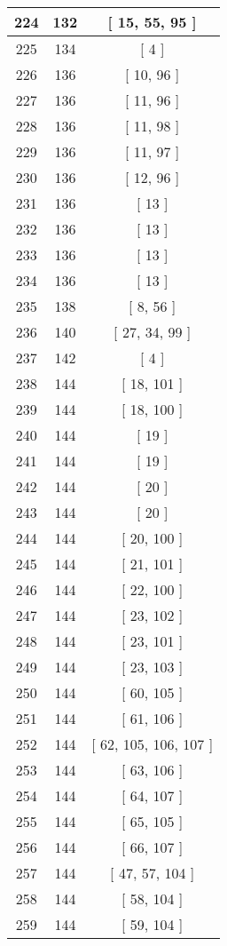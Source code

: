 \begin{center}
\begin{longtable}[H]{|| c c c ||}
\\\hline
224 & 132 & [ 15, 55, 95 ]
\\\hline
225 & 134 & [ 4 ]
\\\hline
226 & 136 & [ 10, 96 ]
\\\hline
227 & 136 & [ 11, 96 ]
\\\hline
228 & 136 & [ 11, 98 ]
\\\hline
229 & 136 & [ 11, 97 ]
\\\hline
230 & 136 & [ 12, 96 ]
\\\hline
231 & 136 & [ 13 ]
\\\hline
232 & 136 & [ 13 ]
\\\hline
233 & 136 & [ 13 ]
\\\hline
234 & 136 & [ 13 ]
\\\hline
235 & 138 & [ 8, 56 ]
\\\hline
236 & 140 & [ 27, 34, 99 ]
\\\hline
237 & 142 & [ 4 ]
\\\hline
238 & 144 & [ 18, 101 ]
\\\hline
239 & 144 & [ 18, 100 ]
\\\hline
240 & 144 & [ 19 ]
\\\hline
241 & 144 & [ 19 ]
\\\hline
242 & 144 & [ 20 ]
\\\hline
243 & 144 & [ 20 ]
\\\hline
244 & 144 & [ 20, 100 ]
\\\hline
245 & 144 & [ 21, 101 ]
\\\hline
246 & 144 & [ 22, 100 ]
\\\hline
247 & 144 & [ 23, 102 ]
\\\hline
248 & 144 & [ 23, 101 ]
\\\hline
249 & 144 & [ 23, 103 ]
\\\hline
250 & 144 & [ 60, 105 ]
\\\hline
251 & 144 & [ 61, 106 ]
\\\hline
252 & 144 & [ 62, 105, 106, 107 ]
\\\hline
253 & 144 & [ 63, 106 ]
\\\hline
254 & 144 & [ 64, 107 ]
\\\hline
255 & 144 & [ 65, 105 ]
\\\hline
256 & 144 & [ 66, 107 ]
\\\hline
257 & 144 & [ 47, 57, 104 ]
\\\hline
258 & 144 & [ 58, 104 ]
\\\hline
259 & 144 & [ 59, 104 ]
\\\hline

\end{longtable}
\end{center}
